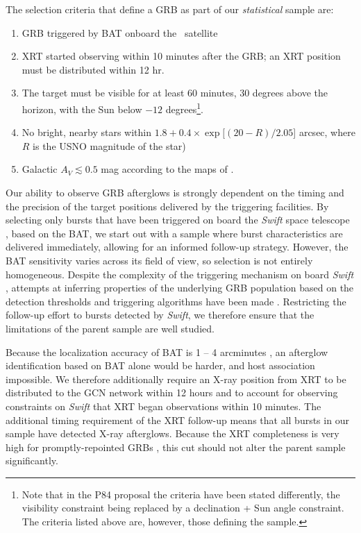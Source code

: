 \documentclass{aa}    %
\begin{document}
The selection criteria that define a GRB as part of our \textit{statistical}
	sample are:

\begin{enumerate}
	
	\item GRB triggered by BAT onboard the \swift~satellite

	\item XRT started observing within 10 minutes after the GRB; an XRT position
	must be distributed within 12 hr.
	
	\item The target must be visible for at least 60 minutes, 30 degrees above the
	horizon, with the Sun below $-12$ degrees\footnote{Note that in the P84
		proposal the criteria have been stated differently, the visibility constraint
		being replaced by a declination + Sun angle constraint. The criteria listed
		above are, however, those defining the sample.}.
	
	\item No bright, nearby stars within $ 1.8 + 0.4 \times \exp[(20 - R)/2.05$]
	arcsec, where $R$ is the USNO magnitude of the star)
	
	\item Galactic $A_V \lesssim 0.5$ mag according to the maps of \citet{Schlegel1998}.
	
\end{enumerate}

Our ability to observe GRB afterglows is strongly dependent on the timing and
the precision of the target positions delivered by the triggering facilities. By
selecting only bursts that have been triggered on board the \textit{Swift} space
telescope \citep{Gehrels2004}, based on the BAT, we start out with a sample
where burst characteristics are delivered immediately, allowing for an informed
follow-up strategy. However, the BAT sensitivity varies across its field of
view, so selection is not entirely homogeneous. Despite the complexity of the
triggering mechanism on board \textit{Swift} \citep{Band2006, Coward2013a},
attempts at inferring properties of the underlying GRB population based on the
detection thresholds and triggering algorithms have been made \citep{Lien2014,
	Graff2016}. Restricting the follow-up effort to bursts detected by
\textit{Swift}, we therefore ensure that the limitations of the parent sample
are well studied.

Because the localization accuracy of BAT is 1 -- 4 arcminutes
\citep{Barthelmy2005}, an afterglow identification based on BAT alone would be
harder, and  host association impossible. We therefore additionally require an
X-ray position from XRT to be distributed to the GCN network
\citep{Barthelmy2000} within 12 hours and to account for observing constraints
on \textit{Swift} that XRT began observations within 10 minutes. The additional
timing requirement of the XRT follow-up means that all bursts in our sample have
detected X-ray afterglows. Because the XRT completeness is very high for
promptly-repointed GRBs \citep{Burrows2007}, this cut should not alter the
parent sample significantly.
\end{document}
